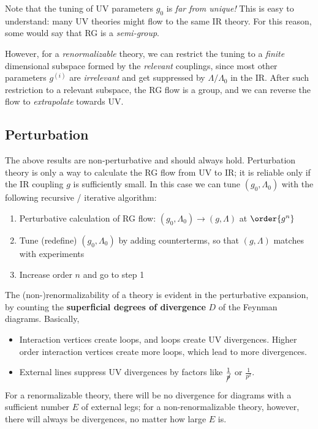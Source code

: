 \documentclass[a4paper,10pt]{article}
\begin{document}
	Note that the tuning of UV parameters $g_0$ is \emph{far from unique!}
	This is easy to understand: many UV theories might flow to the same IR
	theory. For this reason, some would say that RG is a \emph{semi-group}.
	
	However, for a \emph{renormalizable} theory, we can restrict the tuning
	to a \emph{finite} dimensional subspace formed by the \emph{relevant}
	couplings, since most other parameters $g^{(i)}$ are \emph{irrelevant}
	and get suppressed by $\Lambda/\Lambda_0$ in the IR. After such
	restriction to a relevant subspace, the RG flow is a group, and we can
	reverse the flow to \emph{extrapolate} towards UV.
	

\subsection{Perturbation}
	
	The above results are non-perturbative and should always hold.
	Perturbation theory is only a way to calculate the RG flow from UV to
	IR; it is reliable only if the IR coupling $g$ is sufficiently small.
	In this case we can tune $(g_0,\Lambda_0)$ with the following
	recursive / iterative algorithm:
	
	\begin{enumerate}[noitemsep]
	\item
	  Perturbative calculation of RG flow:
	  $(g_0,\Lambda_0)\to (g,\Lambda)$ at $\order{g^n}$
	\item
	  Tune (redefine) $(g_0,\Lambda_0)$ by adding counterterms, so that
	  $(g,\Lambda)$ matches with experiments
	\item
	  Increase order $n$ and go to step 1
	\end{enumerate}
	
	The (non-)renormalizability of a theory is evident in the perturbative
	expansion, by counting the \textbf{superficial degrees of divergence}
	$D$ of the Feynman diagrams. Basically,
	
	\begin{itemize}
	\item
	  Interaction vertices create loops, and loops create UV divergences.
	  Higher order interaction vertices create more loops, which lead to
	  more divergences.
	\item
	  External lines suppress UV divergences by factors like
	  $\frac{1}{\cancel{p}}$ or $\frac{1}{p^2}$.
	\end{itemize}
	
	For a renormalizable theory, there will be no divergence for diagrams
	with a sufficient number $E$ of external legs; for a
	non-renormalizable theory, however, there will always be divergences, no
	matter how large $E$ is.
	
\end{document}

